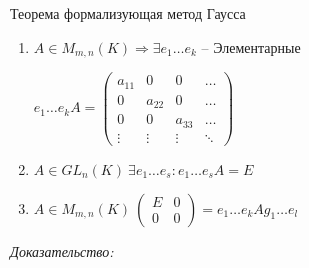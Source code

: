 \documentclass[12pt]{article}
\begin{document}
\begin{theo}{Теорема формализующая метод Гаусса}
    \begin{enumerate}
        \item $A \in M_{m, n}(K) \Rightarrow \exists e_1 \ldots e_k$ -- Элементарные

        $e_1 \ldots e_kA = \begin{pmatrix}
            a_{11} & 0 & 0 & \ldots \\
            0 & a_{22} & 0 & \ldots \\
            0 & 0 & a_{33} & \ldots \\
            \vdots & \vdots & \vdots & \ddots
        \end{pmatrix}$

        \item $A \in GL_n(K)\ \exists e_1 \ldots e_s : e_1 \ldots e_sA = E$
        \item $A \in M_{m, n}(K)\ \begin{pmatrix}
            E & 0 \\
            0 & 0
        \end{pmatrix} = e_1 \ldots e_kAg_1 \ldots e_l$
    \end{enumerate}
\end{theo}

\textit{Доказательство:}
\end{document}
